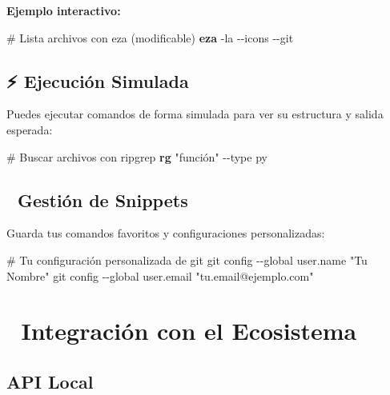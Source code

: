 \documentclass[
  11pt,
  letterpaper,
  oneside,
  openany]{scrbook}
\newenvironment{Shaded}{}{}
\newcommand{\AttributeTok}[1]{\textcolor[rgb]{0.84,0.23,0.29}{#1}}
\newcommand{\CommentTok}[1]{\textcolor[rgb]{0.42,0.45,0.49}{#1}}
\newcommand{\ExtensionTok}[1]{\textcolor[rgb]{0.84,0.23,0.29}{\textbf{#1}}}
\newcommand{\FunctionTok}[1]{\textcolor[rgb]{0.44,0.26,0.76}{#1}}
\newcommand{\NormalTok}[1]{\textcolor[rgb]{0.14,0.16,0.18}{#1}}
\newcommand{\StringTok}[1]{\textcolor[rgb]{0.01,0.18,0.38}{#1}}
\begin{document}
\textbf{Ejemplo interactivo:}

\begin{Shaded}
\begin{Highlighting}[]
\CommentTok{\# Lista archivos con eza (modificable)}
\ExtensionTok{eza} \AttributeTok{{-}la} \AttributeTok{{-}{-}icons} \AttributeTok{{-}{-}git}
\end{Highlighting}
\end{Shaded}

\subsection{⚡ Ejecución Simulada}\label{ejecuciuxf3n-simulada}

Puedes ejecutar comandos de forma simulada para ver su estructura y
salida esperada:

\begin{Shaded}
\begin{Highlighting}[]
\CommentTok{\# Buscar archivos con ripgrep}
\ExtensionTok{rg} \StringTok{"función"} \AttributeTok{{-}{-}type}\NormalTok{ py}
\end{Highlighting}
\end{Shaded}

\subsection{💾 Gestión de Snippets}\label{gestiuxf3n-de-snippets}

Guarda tus comandos favoritos y configuraciones personalizadas:

\begin{Shaded}
\begin{Highlighting}[]
\CommentTok{\# Tu configuración personalizada de git}
\FunctionTok{git}\NormalTok{ config }\AttributeTok{{-}{-}global}\NormalTok{ user.name }\StringTok{"Tu Nombre"}
\FunctionTok{git}\NormalTok{ config }\AttributeTok{{-}{-}global}\NormalTok{ user.email }\StringTok{"tu.email@ejemplo.com"}
\end{Highlighting}
\end{Shaded}

\section{🔗 Integración con el
Ecosistema}\label{integraciuxf3n-con-el-ecosistema}

\subsection{API Local}\label{api-local}
\end{document}
